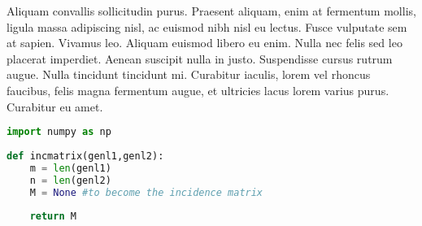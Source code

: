 Aliquam convallis sollicitudin purus. Praesent aliquam, enim at fermentum mollis, ligula massa adipiscing nisl, ac euismod nibh nisl eu lectus. Fusce vulputate sem at sapien. Vivamus leo. Aliquam euismod libero eu enim. Nulla nec felis sed leo placerat imperdiet. Aenean suscipit nulla in justo. Suspendisse cursus rutrum augue. Nulla tincidunt tincidunt mi. Curabitur iaculis, lorem vel rhoncus faucibus, felis magna fermentum augue, et ultricies lacus lorem varius purus. Curabitur eu amet.\\

\begin{lstlisting}[language=Python, caption=Exemple de fonction Python,captionpos=t]
import numpy as np
    
def incmatrix(genl1,genl2):
    m = len(genl1)
    n = len(genl2)
    M = None #to become the incidence matrix
    
    return M
\end{lstlisting}

